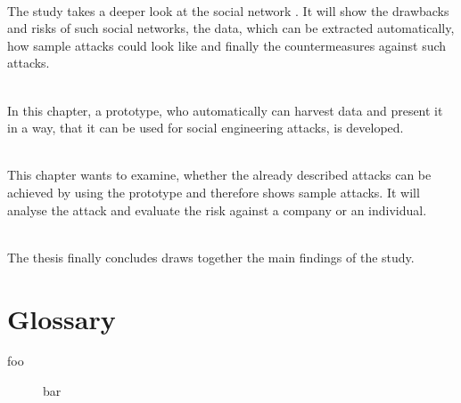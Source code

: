 \vspace{0.5em}\\
\noindent The study takes a deeper look at the social network \Twitter. It will
show the drawbacks and risks of such social networks, the data, which can be
extracted automatically, how sample attacks could look like and finally the
countermeasures against such attacks.

\vspace{0.5em}\\
\noindent In this chapter, a prototype, who automatically can harvest data and
present it in a way, that it can be used for social engineering attacks, is
developed.

\vspace{0.5em}\\
\noindent This chapter wants to examine, whether the already described attacks
can be achieved by using the prototype and therefore shows sample attacks. It
will analyse the attack and evaluate the risk against a company or an
individual.

\vspace{0.5em}\\
\noindent The thesis finally concludes draws together the main findings of the
study.

\def\chapterautorefname{\oldchapterautorefname}
\newpage

\section{Glossary}
\begin{multicols}{2}

\begin{description}
\item[foo] bar
\end{description}

\end{multicols}
